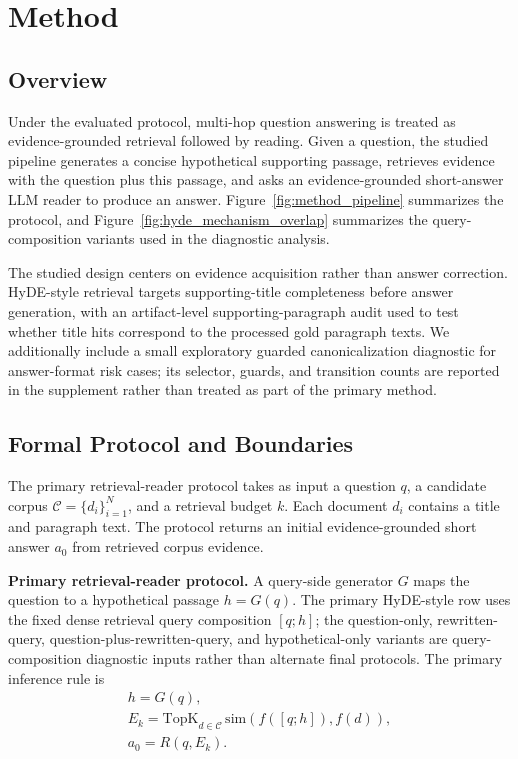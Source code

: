 \section{Method}
\label{sec:method}

\subsection{Overview}
\label{sec:method_overview}

Under the evaluated protocol, multi-hop question answering is treated as evidence-grounded retrieval followed by reading. Given a question, the studied pipeline generates a concise hypothetical supporting passage, retrieves evidence with the question plus this passage, and asks an evidence-grounded short-answer LLM reader to produce an answer. Figure~\ref{fig:method_pipeline} summarizes the protocol, and Figure~\ref{fig:hyde_mechanism_overlap} summarizes the query-composition variants used in the diagnostic analysis.

The studied design centers on evidence acquisition rather than answer correction. HyDE-style retrieval targets supporting-title completeness before answer generation, with an artifact-level supporting-paragraph audit used to test whether title hits correspond to the processed gold paragraph texts. We additionally include a small exploratory guarded canonicalization diagnostic for answer-format risk cases; its selector, guards, and transition counts are reported in the supplement rather than treated as part of the primary method.

\subsection{Formal Protocol and Boundaries}
\label{sec:formal_protocol}

The primary retrieval-reader protocol takes as input a question $q$, a candidate corpus $\mathcal{C}=\{d_i\}_{i=1}^{N}$, and a retrieval budget $k$. Each document $d_i$ contains a title and paragraph text. The protocol returns an initial evidence-grounded short answer $a_0$ from retrieved corpus evidence.

\textbf{Primary retrieval-reader protocol.} A query-side generator $G$ maps the question to a hypothetical passage $h=G(q)$. The primary HyDE-style row uses the fixed dense retrieval query composition $[q;h]$; the question-only, rewritten-query, question-plus-rewritten-query, and hypothetical-only variants are query-composition diagnostic inputs rather than alternate final protocols. The primary inference rule is
\[
\begin{array}{l}
h=G(q),\\[2pt]
E_k=\mathrm{TopK}_{d\in\mathcal{C}}\,\mathrm{sim}(f([q;h]),f(d)),\\[2pt]
a_0=R(q,E_k).
\end{array}
\]

